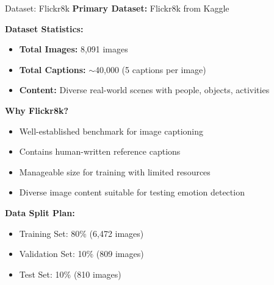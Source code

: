 \documentclass{beamer}
\begin{document}
\begin{frame}{Dataset: Flickr8k}
    \textbf{Primary Dataset:} Flickr8k from Kaggle
    
    \vspace{0.5cm}
    \textbf{Dataset Statistics:}
    \begin{itemize}
        \item \textbf{Total Images:} 8,091 images
        \item \textbf{Total Captions:} $\sim$40,000 (5 captions per image)
        \item \textbf{Content:} Diverse real-world scenes with people, objects, activities
    \end{itemize}
    
    \vspace{0.5cm}
    \textbf{Why Flickr8k?}
    \begin{itemize}
        \item Well-established benchmark for image captioning
        \item Contains human-written reference captions
        \item Manageable size for training with limited resources
        \item Diverse image content suitable for testing emotion detection
    \end{itemize}
    
    \textbf{Data Split Plan:}
    \begin{itemize}
        \item Training Set: 80\% (6,472 images)
        \item Validation Set: 10\% (809 images)
        \item Test Set: 10\% (810 images)
    \end{itemize}
\end{frame}

    
        
        
\end{document}
